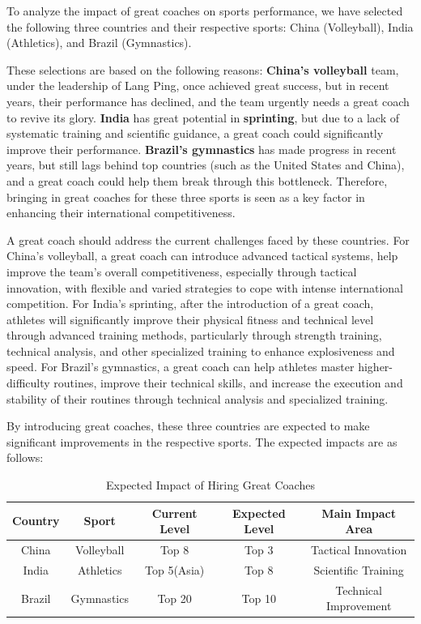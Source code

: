 \documentclass{mcmthesis}  %
\begin{document}
To analyze the impact of great coaches on sports performance, we have selected the following three countries and their respective sports: China (Volleyball), India (Athletics), and Brazil (Gymnastics).

These selections are based on the following reasons:\textbf{ China's volleyball} team, under the leadership of Lang Ping, once achieved great success, but in recent years, their performance has declined, and the team urgently needs a great coach to revive its glory.\textbf{ India} has great potential in \textbf{sprinting}, but due to a lack of systematic training and scientific guidance, a great coach could significantly improve their performance.\textbf{ Brazil's gymnastics} has made progress in recent years, but still lags behind top countries (such as the United States and China), and a great coach could help them break through this bottleneck. Therefore, bringing in great coaches for these three sports is seen as a key factor in enhancing their international competitiveness.

A great coach should address the current challenges faced by these countries. For China’s volleyball, a great coach can introduce advanced tactical systems, help improve the team's overall competitiveness, especially through tactical innovation, with flexible and varied strategies to cope with intense international competition. For India’s sprinting, after the introduction of a great coach, athletes will significantly improve their physical fitness and technical level through advanced training methods, particularly through strength training, technical analysis, and other specialized training to enhance explosiveness and speed. For Brazil’s gymnastics, a great coach can help athletes master higher-difficulty routines, improve their technical skills, and increase the execution and stability of their routines through technical analysis and specialized training.

By introducing great coaches, these three countries are expected to make significant improvements in the respective sports. The expected impacts are as follows:

\begin{table}[h]
\centering
\begin{tabular}{|c|c|c|c|c|}
\hline
Country & Sport & Current Level & Expected Level & Main Impact Area \\
\hline
China & Volleyball & Top 8 & Top 3 & Tactical Innovation \\
\hline
India & Athletics & Top 5(Asia) & Top 8 & Scientific Training \\
\hline
Brazil & Gymnastics & Top 20 & Top 10 & Technical Improvement \\
\hline
\end{tabular}
\caption{Expected Impact of Hiring Great Coaches}
\end{table}
\end{document}
